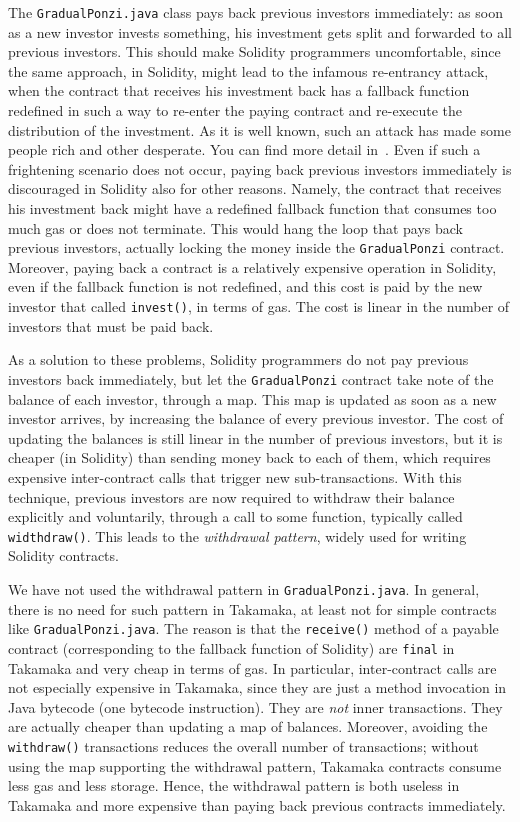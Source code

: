 The \texttt{GradualPonzi.java} class pays back previous investors immediately:
as soon as a new investor invests something, his investment gets
split and forwarded to all previous investors. This should
make Solidity programmers uncomfortable, since the same approach,
in Solidity, might lead to the infamous re-entrancy attack, when the
contract that receives his investment back has a
fallback function redefined in such a way to re-enter the paying contract and
re-execute the distribution of the investment.
As it is well known, such an attack has made some people rich and other
desperate. You can find more detail
in~\cite{AntonopoulosWPMP25}.
Even if such a frightening scenario does not occur,
paying back previous investors immediately is discouraged in Solidity
also for other reasons. Namely, the contract that receives his
investment back might have a redefined fallback function that
consumes too much gas or does not terminate. This would hang the
loop that pays back previous investors, actually locking the
money inside the \texttt{GradualPonzi} contract. Moreover, paying back
a contract is a relatively expensive operation in Solidity, even if the
fallback function is not redefined, and this cost is paid by the
new investor that called \texttt{invest()}, in terms of gas. The cost is linear
in the number of investors that must be paid back.

As a solution to these problems, Solidity programmers do not pay previous
investors back immediately, but let the \texttt{GradualPonzi} contract take
note of the balance of each investor, through a map.
This map is updated as soon as a new investor arrives, by increasing the
balance of every previous investor. The cost of updating the balances
is still linear in the number of previous investors, but it is cheaper
(in Solidity) than sending money back to each of them, which
requires expensive inter-contract calls that trigger new sub-transactions.
With this technique, previous investors are
now required to withdraw their balance explicitly and voluntarily,
through a call to some function, typically called \texttt{widthdraw()}.
This leads to the \emph{withdrawal pattern}, widely used for writing Solidity contracts.

We have not used the withdrawal pattern in \texttt{GradualPonzi.java}. In general,
there is no need for such pattern in Takamaka, at least not for simple
contracts like \texttt{GradualPonzi.java}. The reason is that the
\texttt{receive()}
method of a payable contract (corresponding to the
fallback function of Solidity) are \texttt{final} in Takamaka and very cheap
in terms of gas. In particular, inter-contract calls are not
especially expensive in Takamaka, since they are just a method
invocation in Java bytecode (one bytecode instruction). They are \emph{not} inner transactions.
They are actually cheaper than
updating a map of balances. Moreover, avoiding the \texttt{withdraw()} transactions
reduces the overall number of transactions;
without using the map supporting the withdrawal pattern, Takamaka contracts
consume less gas and less storage.
Hence, the withdrawal pattern is both
useless in Takamaka and more expensive than paying back previous contracts immediately.

